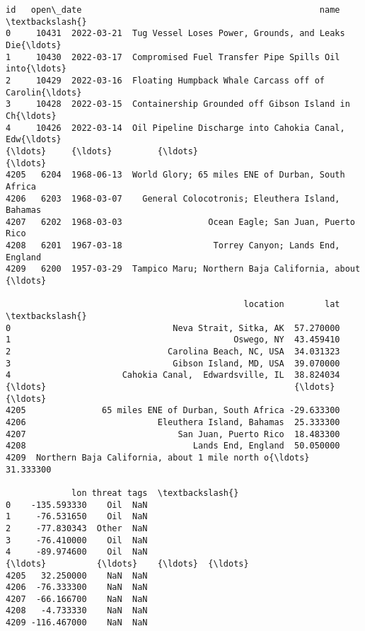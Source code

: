 \documentclass[11pt]{article}
\makeatletter
\newcommand{\boxspacing}{\kern\kvtcb@left@rule\kern\kvtcb@boxsep}
\newcommand{\prompt}[4]{
        {\ttfamily\llap{{\color{#2}[#3]:\hspace{3pt}#4}}\vspace{-\baselineskip}}
    }
\makeatother
\begin{document}
            \begin{tcolorbox}[breakable, size=fbox, boxrule=.5pt, pad at break*=1mm, opacityfill=0]
\prompt{Out}{outcolor}{106}{\boxspacing}
\begin{Verbatim}[commandchars=\\\{\}]
         id   open\_date                                               name  \textbackslash{}
0     10431  2022-03-21  Tug Vessel Loses Power, Grounds, and Leaks Die{\ldots}
1     10430  2022-03-17  Compromised Fuel Transfer Pipe Spills Oil into{\ldots}
2     10429  2022-03-16  Floating Humpback Whale Carcass off of Carolin{\ldots}
3     10428  2022-03-15  Containership Grounded off Gibson Island in Ch{\ldots}
4     10426  2022-03-14  Oil Pipeline Discharge into Cahokia Canal, Edw{\ldots}
{\ldots}     {\ldots}         {\ldots}                                                {\ldots}
4205   6204  1968-06-13  World Glory; 65 miles ENE of Durban, South Africa
4206   6203  1968-03-07    General Colocotronis; Eleuthera Island, Bahamas
4207   6202  1968-03-03                 Ocean Eagle; San Juan, Puerto Rico
4208   6201  1967-03-18                  Torrey Canyon; Lands End, England
4209   6200  1957-03-29  Tampico Maru; Northern Baja California, about {\ldots}

                                               location        lat  \textbackslash{}
0                                Neva Strait, Sitka, AK  57.270000
1                                            Oswego, NY  43.459410
2                               Carolina Beach, NC, USA  34.031323
3                                Gibson Island, MD, USA  39.070000
4                      Cahokia Canal,  Edwardsville, IL  38.824034
{\ldots}                                                 {\ldots}        {\ldots}
4205               65 miles ENE of Durban, South Africa -29.633300
4206                          Eleuthera Island, Bahamas  25.333300
4207                              San Juan, Puerto Rico  18.483300
4208                                 Lands End, England  50.050000
4209  Northern Baja California, about 1 mile north o{\ldots}  31.333300

             lon threat tags  \textbackslash{}
0    -135.593330    Oil  NaN
1     -76.531650    Oil  NaN
2     -77.830343  Other  NaN
3     -76.410000    Oil  NaN
4     -89.974600    Oil  NaN
{\ldots}          {\ldots}    {\ldots}  {\ldots}
4205   32.250000    NaN  NaN
4206  -76.333300    NaN  NaN
4207  -66.166700    NaN  NaN
4208   -4.733330    NaN  NaN
4209 -116.467000    NaN  NaN


\end{Verbatim}
\end{tcolorbox}
\end{document}
